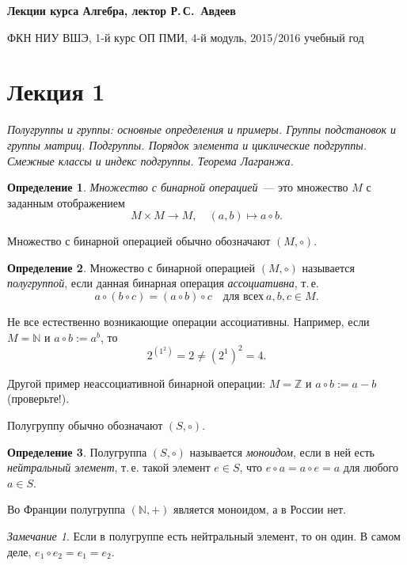 \documentclass[a4paper,10pt]{amsart}
\def\ZZ{{\mathbb Z}}%
\def\NN{{\mathbb N}}%
\theoremstyle{definition}
\newtheorem{definition}{Определение}
\theoremstyle{remark}
\newtheorem{remark}{Замечание}
\begin{document}
%
\sloppy
%
\centerline{\large \bf Лекции курса \guillemotleft
Алгебра\guillemotright{}, лектор Р.\,С.~Авдеев}

\smallskip

\centerline{\large ФКН НИУ ВШЭ, 1-й курс ОП ПМИ, 4-й модуль,
2015/2016 учебный год}


\bigskip

\section*{Лекция 1}

\medskip

{\it Полугруппы и группы: основные определения и примеры. Группы
подстановок и группы матриц. Подгруппы. Порядок элемента и
циклические подгруппы. Смежные классы и индекс подгруппы. Теорема
Лагранжа.}

\medskip

\begin{definition}
{\it Множество с бинарной операцией}~--- это множество $M$ с
заданным отображением
$$
M\times M \to M, \quad (a,b) \mapsto a\circ b.
$$
\end{definition}

Множество с бинарной операцией обычно обозначают $(M,\circ)$.

\begin{definition}
Множество с бинарной операцией $(M,\circ)$ называется {\it
полугруппой}, если данная бинарная операция {\it ассоциативна},
т.\,е.
$$
a\circ (b \circ c) = (a\circ b)\circ c \quad \text{для всех} \ a,b,c\in M.
$$
\end{definition}

Не все естественно возникающие операции ассоциативны. Например, если
$M=\NN$ и $a\circ b:=a^b$, то
$$
2^{\left(1^2\right)}=2\ne (2^1)^2=4.
$$

Другой пример неассоциативной бинарной операции: $M = \ZZ$ и $a
\circ b := a - b$ (проверьте!).

Полугруппу обычно обозначают $(S,\circ)$.

\begin{definition}
Полугруппа $(S,\circ)$ называется {\it моноидом}, если в ней есть
{\it нейтральный элемент}, т.\,е. такой элемент $e\in S$, что
$e\circ a=a\circ e=a$ для любого $a\in S$.
\end{definition}

Во Франции полугруппа $(\NN,+)$ является моноидом, а в России нет.

\begin{remark}
Если в полугруппе есть нейтральный элемент, то он один. В самом
деле, $e_1\circ e_2=e_1=e_2$.
\end{remark}
\end{document}
